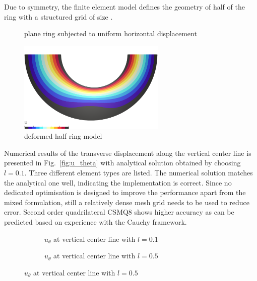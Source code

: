 \documentclass[3p,sort&compress,11pt,fleqn]{elsarticle}
\newcommand*{\figref}[1]{Fig.~\ref{#1}}
\begin{document}
Due to symmetry, the finite element model defines the geometry of half of the ring with a structured grid of size .
\begin{figure}[H]
\centering\footnotesize
{}
\caption{plane ring subjected to uniform horizontal displacement}\label{fig:ring}
\end{figure}

\begin{figure}[H]
\centering\footnotesize
\includegraphics[width=7cm]{MODEL/RING/MODEL}
\caption{deformed half ring model}
\end{figure}

Numerical results of the transverse displacement along the vertical center line is presented in \figref{fig:u_theta} with analytical solution obtained by choosing $l=\num{0.1}$. Three different element types are listed. The numerical solution matches the analytical one well, indicating the implementation is correct. Since no dedicated optimisation is designed to improve the performance apart from the mixed formulation, still a relatively dense mesh grid needs to be used to reduce error. Second order quadrilateral CSMQ8 shows higher accuracy as can be predicted based on experience with the Cauchy framework.
\begin{figure}[H]
\centering\footnotesize
\begin{subfigure}[b]{.49\textwidth}\centering

\caption{$u_\theta$ at vertical center line with $l=\num{0.1}$}\label{fig:u_theta_a}
\end{subfigure}\hfill
\begin{subfigure}[b]{.49\textwidth}\centering

\caption{$u_\theta$ at vertical center line with $l=\num{0.5}$}\label{fig:u_theta_b}
\end{subfigure}
\end{figure}
\end{document}
